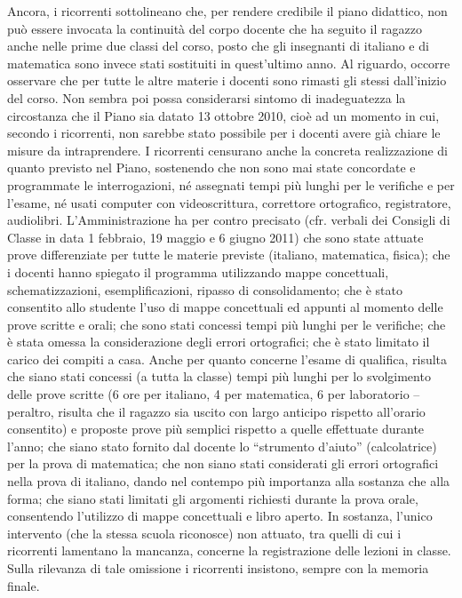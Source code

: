 Ancora, i ricorrenti sottolineano che, per rendere credibile il piano didattico, non può essere invocata la continuità del corpo docente che ha seguito il ragazzo anche nelle prime due classi del corso, posto che gli insegnanti di italiano e di matematica sono invece stati sostituiti in quest’ultimo anno.
Al riguardo, occorre osservare che per tutte le altre materie i docenti sono rimasti gli stessi dall’inizio del corso.
Non sembra poi possa considerarsi sintomo di inadeguatezza la circostanza che il Piano sia datato 13 ottobre 2010, cioè ad un momento in cui, secondo i ricorrenti, non sarebbe stato possibile per i docenti avere già chiare le misure da intraprendere.
I ricorrenti censurano anche la concreta realizzazione di quanto previsto nel Piano, sostenendo che non sono mai state concordate e programmate le interrogazioni, né assegnati tempi più lunghi per le verifiche e per l’esame, né usati computer con videoscrittura, correttore ortografico, registratore, audiolibri.
L’Amministrazione ha per contro precisato (cfr. verbali dei Consigli di Classe in data 1 febbraio, 19 maggio e 6 giugno 2011) che sono state attuate prove differenziate per tutte le materie previste (italiano, matematica, fisica); che i docenti hanno spiegato il programma utilizzando mappe concettuali, schematizzazioni, esemplificazioni, ripasso di consolidamento; che è stato consentito allo studente l’uso di mappe concettuali ed appunti al momento delle prove scritte e orali; che sono stati concessi tempi più lunghi per le verifiche; che è stata omessa la considerazione degli errori ortografici; che è stato limitato il carico dei compiti a casa.
Anche per quanto concerne l’esame di qualifica, risulta che siano stati concessi (a tutta la classe) tempi più lunghi per lo svolgimento delle prove scritte (6 ore per italiano, 4 per matematica, 6 per laboratorio – peraltro, risulta che il ragazzo sia uscito con largo anticipo rispetto all’orario consentito) e proposte prove più semplici rispetto a quelle effettuate durante l’anno; che siano stato fornito dal docente lo “strumento d’aiuto” (calcolatrice) per la prova di matematica; che non siano stati considerati gli errori ortografici nella prova di italiano, dando nel contempo più importanza alla sostanza che alla forma; che siano stati limitati gli argomenti richiesti durante la prova orale, consentendo l’utilizzo di mappe concettuali e libro aperto.
In sostanza, l’unico intervento (che la stessa scuola riconosce) non attuato, tra quelli di cui i ricorrenti lamentano la mancanza, concerne la registrazione delle lezioni in classe. Sulla rilevanza di tale omissione i ricorrenti insistono, sempre con la memoria finale.
